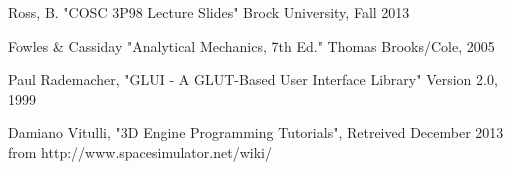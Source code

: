 
\begin{thebibliography}{1}

Ross, B. "COSC 3P98 Lecture Slides" Brock University, Fall 2013

Fowles \& Cassiday "Analytical Mechanics, 7th Ed." Thomas Brooks/Cole, 2005

Paul Rademacher, "GLUI - A GLUT-Based User Interface Library" Version 2.0, 1999

Damiano Vitulli, "3D Engine Programming Tutorials", Retreived December 2013 from
http://www.spacesimulator.net/wiki/

\end{thebibliography}
